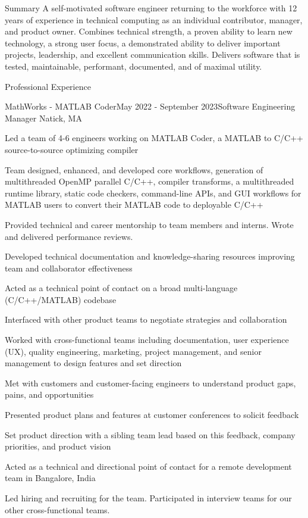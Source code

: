 \documentclass[
	usletter %
	10pt, %
]{resume} %
\begin{document}
\begin{rSection}{Summary}
	A self-motivated software engineer returning to the workforce with 12 years of experience in technical computing as an individual contributor, manager, and product owner. Combines technical strength, a proven ability to learn new technology, a strong user focus, a demonstrated ability to deliver important projects, leadership, and excellent communication skills. Delivers software that is tested, maintainable, performant, documented, and of maximal utility.
\end{rSection}

\begin{rSection}{Professional Experience}
	\begin{rSubsection}{MathWorks - MATLAB Coder}{May 2022 - September 2023}{Software Engineering Manager}
		{Natick, MA}
		\item Led a team of 4-6 engineers working on MATLAB Coder, a MATLAB to C/C++ source-to-source optimizing compiler
		\item Team designed, enhanced, and developed core workflows, generation of multithreaded OpenMP parallel C/C++, compiler transforms, a multithreaded runtime library, static code checkers, command-line APIs, and GUI workflows for MATLAB users to convert their MATLAB code to deployable C/C++ %
		\item Provided technical and career mentorship to team members and interns. Wrote and delivered performance reviews.
		\item Developed technical documentation and knowledge-sharing resources improving team and collaborator effectiveness
		\item Acted as a technical point of contact on a broad multi-language (C/C++/MATLAB) codebase
		\item Interfaced with other product teams to negotiate strategies and collaboration
		\item Worked with cross-functional teams including documentation, user experience (UX), quality engineering, marketing, project management, and senior management to design features and set direction
		\item Met with customers and customer-facing engineers to understand product gaps, pains, and opportunities
		\item Presented product plans and features at customer conferences to solicit feedback
		\item Set product direction with a sibling team lead based on this feedback, company priorities, and product vision
		\item Acted as a technical and directional point of contact for a remote development team in Bangalore, India
		\item Led hiring and recruiting for the team. Participated in interview teams for our other cross-functional teams.
	\end{rSubsection}


\end{rSection}
\end{document}
